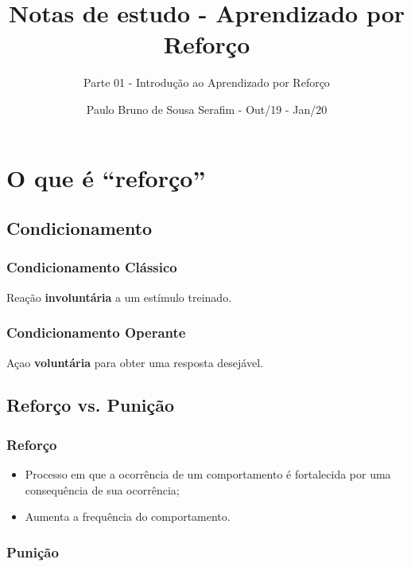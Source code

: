 \documentclass{article}
\title{Notas de estudo - Aprendizado por Reforço}
\author{Parte 01 - Introdução ao Aprendizado por Reforço}
\date{Paulo Bruno de Sousa Serafim - Out/19 - Jan/20}
\begin{document}
\maketitle

\section{O que é ``reforço''}

    \subsection{Condicionamento}
    
        \subsubsection{Condicionamento Clássico}
        
            Reação \textbf{involuntária} a um estímulo treinado.
        
        \subsubsection{Condicionamento Operante}
        
            Açao \textbf{voluntária} para obter uma resposta desejável.
        
    \subsection{Reforço vs. Punição}
    
        \subsubsection{Reforço}
        
            \begin{itemize}
                \item Processo em que a ocorrência de um comportamento é fortalecida por uma consequência de sua ocorrência;
                \item Aumenta a frequência do comportamento.
            \end{itemize}
        
        \subsubsection{Punição}
        
\end{document}
